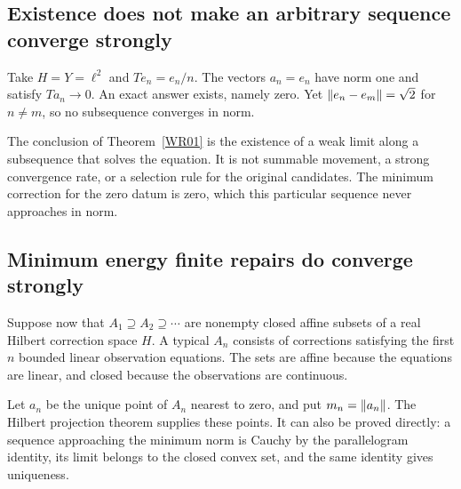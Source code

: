 \subsection{Existence does not make an arbitrary sequence converge strongly}
Take $H=Y=\ell^2$ and $Te_n=e_n/n$. The vectors $a_n=e_n$ have norm one and satisfy $Ta_n\to0$. An exact answer exists, namely zero. Yet $\left\lVert e_n-e_m\right\rVert=\sqrt2$ for $n\ne m$, so no subsequence converges in norm.

The conclusion of Theorem~\ref{WR01} is the existence of a weak limit along a subsequence that solves the equation. It is not summable movement, a strong convergence rate, or a selection rule for the original candidates. The minimum correction for the zero datum is zero, which this particular sequence never approaches in norm.

\subsection{Minimum energy finite repairs do converge strongly}

Suppose now that $A_1\supseteq A_2\supseteq\cdots$ are nonempty closed affine subsets of a real Hilbert correction space $H$. A typical $A_n$ consists of corrections satisfying the first $n$ bounded linear observation equations. The sets are affine because the equations are linear, and closed because the observations are continuous.

Let $a_n$ be the unique point of $A_n$ nearest to zero, and put $m_n=\left\lVert a_n\right\rVert$. The Hilbert projection theorem supplies these points. It can also be proved directly: a sequence approaching the minimum norm is Cauchy by the parallelogram identity, its limit belongs to the closed convex set, and the same identity gives uniqueness.


